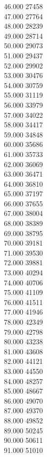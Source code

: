 { 46.000	27458 \\
 47.000	27764 \\
 48.000	28239 \\
 49.000	28714 \\
 50.000	29073 \\
 51.000	29437 \\
 52.000	29902 \\
 53.000	30476 \\
 54.000	30759 \\
 55.000	31119 \\
 56.000	33979 \\
 57.000	34022 \\
 58.000	34417 \\
 59.000	34848 \\
 60.000	35686 \\
 61.000	35733 \\
 62.000	36069 \\
 63.000	36471 \\
 64.000	36810 \\
 65.000	37197 \\
 66.000	37655 \\
 67.000	38004 \\
 68.000	38389 \\
 69.000	38795 \\
 70.000	39181 \\
 71.000	39530 \\
 72.000	39881 \\
 73.000	40294 \\
 74.000	40706 \\
 75.000	41109 \\
 76.000	41511 \\
 77.000	41946 \\
 78.000	42349 \\
 79.000	42798 \\
 80.000	43238 \\
 81.000	43608 \\
 82.000	44121 \\
 83.000	44550 \\
 84.000	48257 \\
 85.000	48667 \\
 86.000	49070 \\
 87.000	49370 \\
 88.000	49852 \\
 89.000	50245 \\
 90.000	50611 \\
 91.000	51010 \\
}
